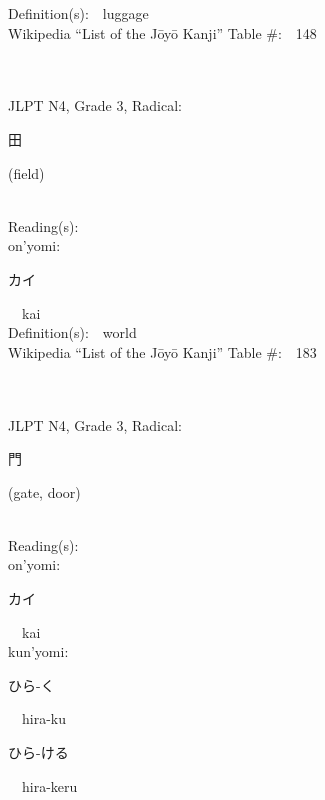 \begin{multicols}{2}
Definition(s):\ \ luggage \\
Wikipedia ``List of the J\=oy\=o Kanji'' Table \#:\ \ 148 \\
\ \ \\
{\fontsize{34pt}{40pt}  }\ \ \\  %
{JLPT N4, Grade 3, Radical:\ \ {\begin{CJK}{UTF8}{min} 田 \end{CJK}} (field) } \\
Reading(s):\ \ \\
{\hspace*{1em}}on'yomi:\ \ \\
{\hspace*{2em}}{\begin{CJK}{UTF8}{min} カイ \end{CJK}}\ \ kai\ \ \\
Definition(s):\ \ world \\
Wikipedia ``List of the J\=oy\=o Kanji'' Table \#:\ \ 183 \\
\ \ \\
{\fontsize{34pt}{40pt}  }\ \ \\  %
{JLPT N4, Grade 3, Radical:\ \ {\begin{CJK}{UTF8}{min} 門 \end{CJK}} (gate, door) } \\
Reading(s):\ \ \\
{\hspace*{1em}}on'yomi:\ \ \\
{\hspace*{2em}}{\begin{CJK}{UTF8}{min} カイ \end{CJK}}\ \ kai\ \ \\
{\hspace*{1em}}kun'yomi:\ \ \\
{\hspace*{2em}}{\begin{CJK}{UTF8}{min} ひら-く \end{CJK}}\ \ hira-ku\ \ \\
{\hspace*{2em}}{\begin{CJK}{UTF8}{min} ひら-ける \end{CJK}}\ \ hira-keru\ \ \\

\end{multicols}

